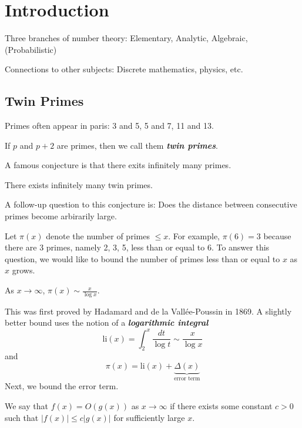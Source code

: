 \section{Introduction}

Three branches of number theory: Elementary, Analytic, Algebraic, (Probabilistic)

Connections to other subjects: Discrete mathematics, physics, etc.

\subsection{Twin Primes}

Primes often appear in paris: 3 and 5, 5 and 7, 11 and 13.

\begin{definition}
    If $p$ and $p+2$ are primes, then we call them \textit{\textbf{twin primes}}.
\end{definition}

A famous conjecture is that there exits infinitely many primes.

\begin{conjecture}
    There exists infinitely many twin primes.
\end{conjecture}

A follow-up question to this conjecture is: Does the distance between consecutive primes become arbirarily large.

Let $\pi(x)$ denote the number of primes $\leq x$. For example, $\pi(6)=3$ because there are 3 primes, namely 2, 3, 5, less than or equal to 6. To answer this question, we would like to bound the number of primes less than or equal to $x$ as $x$ grows.

\begin{theorem}
    As $x \to \infty$, $\pi(x) \sim \frac{x}{\log x}$.
\end{theorem}

This was first proved by Hadamard and de la Vall\'ee-Poussin in 1869. A slightly better bound uses the notion of a \textit{\textbf{logarithmic integral}}
$$
\mathrm{li}(x) = \int_2^x \frac{dt}{\log t} \sim \frac{x}{\log x}
$$
and
$$
\pi(x) = \mathrm{li}(x) + \underbrace{\Delta(x)}_{\text{error term}}
$$
Next, we bound the error term.

\begin{definition}[Big-O]
    We say that $f(x) = O(g(x))$ as $x \to \infty$ if there exists some constant $c > 0$ such that $|f(x)| \leq c|g(x)|$ for sufficiently large $x$.
\end{definition}

